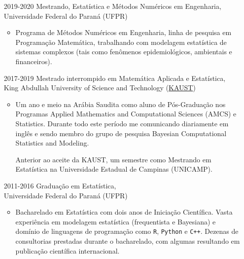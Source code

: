 \message{ !name(vitae.tex)}\documentclass[12pt]{article}
\begin{document}
\begin{itemize}
 \item[2019-2020] Mestrando, Estat\'{i}stica e M\'{e}todos Num\'{e}ricos
                  em Engenharia,\\
                  Universidade Federal do Paran\'{a} (UFPR)
  \begin{itemize}
   \item Programa de M\'{e}todos Num\'{e}ricos em Engenharia, linha de
         pesquisa em Programa\c{c}\~{a}o Matem\'{a}tica, trabalhando com
         modelagem estat\'{i}stica de sistemas complexos (tais como
         fen\^{o}menos epidemiol\'{o}gicos, ambientais e financeiros).
  \end{itemize}

 \item[2017-2019] Mestrado interrompido em Matem\'{a}tica Aplicada e
                  Estat\'{i}stica,\\
                  King Abdullah University of Science and Technology
                  (\href{https://kaust.edu.sa/en}{\color{blue}KAUST})
  \begin{itemize}
   \item Um ano e meio na Ar\'{a}bia Saudita como aluno de
         P\'{o}s-Gradua\c{c}\~{a}o nos Programas Applied Mathematics and
         Computational Sciences (AMCS) e Statistics. Durante todo este
         per\'{i}odo me comunicando diariamente em ingl\^{e}s e sendo
         membro do grupo de pesquisa Bayesian Computational Statistics
         and Modeling.

         Anterior ao aceite da KAUST, um semestre como Mestrando em
         Estat\'{i}stica na Universidade Estadual de Campinas (UNICAMP).
  \end{itemize}

 \item[2011-2016] Gradua\c{c}\~{a}o em Estat\'{i}stica,\\
                  Universidade Federal do Paran\'{a}
                  (UFPR)
  \begin{itemize}
   \item Bacharelado em Estat\'{i}stica com dois anos de
         Inicia\c{c}\~{a}o Cient\'{i}fica. Vasta experi\^{e}ncia em
         modelagem estat\'{i}stica (frequentista e Bayesiana) e
         dom\'{i}nio de linguagens de programa\c{c}\~{a}o como
         \texttt{R}, \texttt{Python} e \texttt{C++}. Dezenas de
         consultorias prestadas durante o bacharelado, com algumas
         resultando em publica\c{c}\~{a}o cient\'{i}fica internacional.
  \end{itemize}
\end{itemize}
\end{document}
